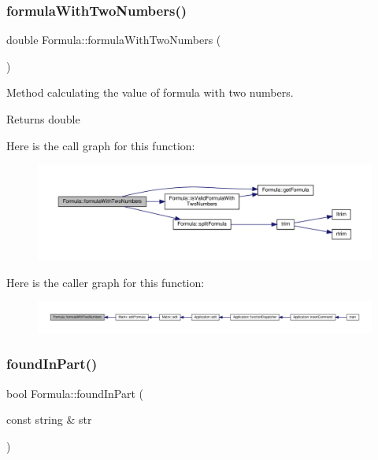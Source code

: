 \subsubsection{\texorpdfstring{formula\+With\+Two\+Numbers()}{formulaWithTwoNumbers()}}
{\footnotesize\ttfamily double Formula\+::formula\+With\+Two\+Numbers (\begin{DoxyParamCaption}{ }\end{DoxyParamCaption})}

Method calculating the value of formula with two numbers. \begin{DoxyReturn}{Returns}
double 
\end{DoxyReturn}
Here is the call graph for this function\+:
\nopagebreak
\begin{figure}[H]
\begin{center}
\leavevmode
\includegraphics[width=350pt]{class_formula_a2159ffdb34d80f2bee422eee89fc871a_cgraph}
\end{center}
\end{figure}
Here is the caller graph for this function\+:
\nopagebreak
\begin{figure}[H]
\begin{center}
\leavevmode
\includegraphics[width=350pt]{class_formula_a2159ffdb34d80f2bee422eee89fc871a_icgraph}
\end{center}
\end{figure}
\mbox{\label{class_formula_a79079cea46f8320cd7a63f576251baac}} 
\subsubsection{\texorpdfstring{found\+In\+Part()}{foundInPart()}}
{\footnotesize\ttfamily bool Formula\+::found\+In\+Part (\begin{DoxyParamCaption}\item[{const string \&}]{str }\end{DoxyParamCaption})\hspace{0.3cm}{\ttfamily [private]}}

